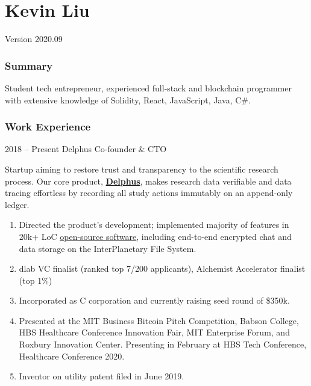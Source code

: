 \documentclass[paper=letter]{tccv}
\begin{document}
\part{Kevin Liu}


Version 2020.09

\section{Summary}

Student tech entrepreneur, experienced full-stack and blockchain programmer with extensive knowledge of Solidity, React, JavaScript, Java, C\#.

\section{Work Experience}

\begin{eventlist}

\item{2018 -- Present}
     {Delphus}
     {Co-founder \& CTO}

Startup aiming to restore trust and transparency to the scientific research process. Our core product, \href{https://delph.us}{\textbf{Delphus}}, makes research data verifiable and data tracing effortless by recording all study actions immutably on an append-only ledger.

\end{eventlist}

\vspace{-0.5cm}
\begin{enumerate}
     \item Directed the product's development; implemented majority of features in 20k+ LoC \href{https://gitlab.scintillating.us/scintillating/delphus}{open-source software}, including end-to-end encrypted chat and data storage on the InterPlanetary File System.
     \item dlab VC finalist (ranked top 7/200 applicants), Alchemist Accelerator finalist (top 1\%)
     \item Incorporated as C corporation and currently raising seed round of \$350k.
     \item Presented at the MIT Business Bitcoin Pitch Competition, Babson College, HBS Healthcare Conference Innovation Fair, MIT Enterprise Forum, and Roxbury Innovation Center. Presenting in February at HBS Tech Conference, Healthcare Conference 2020.
     \item Inventor on utility patent filed in June 2019.
\end{enumerate}
\end{document}
